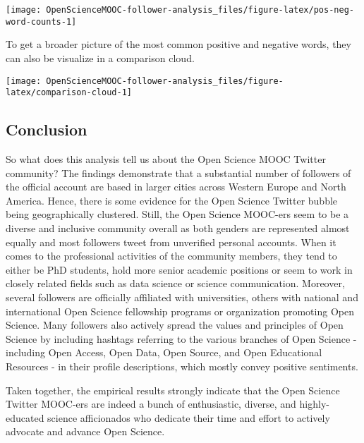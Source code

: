 \documentclass[]{article}
\newenvironment{Shaded}{\begin{snugshade}}{\end{snugshade}}
\newcommand{\KeywordTok}[1]{\textcolor[rgb]{0.13,0.29,0.53}{\textbf{#1}}}
\newcommand{\DataTypeTok}[1]{\textcolor[rgb]{0.13,0.29,0.53}{#1}}
\newcommand{\DecValTok}[1]{\textcolor[rgb]{0.00,0.00,0.81}{#1}}
\newcommand{\StringTok}[1]{\textcolor[rgb]{0.31,0.60,0.02}{#1}}
\newcommand{\CommentTok}[1]{\textcolor[rgb]{0.56,0.35,0.01}{\textit{#1}}}
\newcommand{\OtherTok}[1]{\textcolor[rgb]{0.56,0.35,0.01}{#1}}
\newcommand{\OperatorTok}[1]{\textcolor[rgb]{0.81,0.36,0.00}{\textbf{#1}}}
\newcommand{\NormalTok}[1]{#1}
\begin{document}
\begin{center}\texttt{[image: OpenScienceMOOC-follower-analysis\_files/figure-latex/pos-neg-word-counts-1]} \end{center}

To get a broader picture of the most common positive and negative words,
they can also be visualize in a comparison cloud.

\begin{Shaded}
\end{Shaded}

\begin{center}\texttt{[image: OpenScienceMOOC-follower-analysis\_files/figure-latex/comparison-cloud-1]} \end{center}

\subsection{Conclusion}\label{conclusion}

So what does this analysis tell us about the Open Science MOOC Twitter
community? The findings demonstrate that a substantial number of
followers of the official account are based in larger cities across
Western Europe and North America. Hence, there is some evidence for the
Open Science Twitter bubble being geographically clustered. Still, the
Open Science MOOC-ers seem to be a diverse and inclusive community
overall as both genders are represented almost equally and most
followers tweet from unverified personal accounts. When it comes to the
professional activities of the community members, they tend to either be
PhD students, hold more senior academic positions or seem to work in
closely related fields such as data science or science communication.
Moreover, several followers are officially affiliated with universities,
others with national and international Open Science fellowship programs
or organization promoting Open Science. Many followers also actively
spread the values and principles of Open Science by including hashtags
referring to the various branches of Open Science - including Open
Access, Open Data, Open Source, and Open Educational Resources - in
their profile descriptions, which mostly convey positive sentiments.

Taken together, the empirical results strongly indicate that the Open
Science Twitter MOOC-ers are indeed a bunch of enthusiastic, diverse,
and highly-educated science afficionados who dedicate their time and
effort to actively advocate and advance Open Science.
\end{document}
